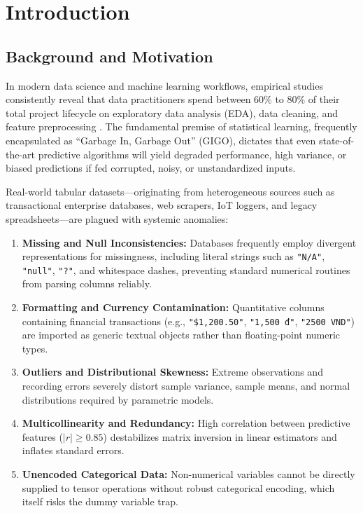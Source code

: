 \section{Introduction}

\subsection{Background and Motivation}
In modern data science and machine learning workflows, empirical studies consistently reveal that data practitioners spend between 60\% to 80\% of their total project lifecycle on exploratory data analysis (EDA), data cleaning, and feature preprocessing \cite{mckinney2010}. The fundamental premise of statistical learning, frequently encapsulated as ``Garbage In, Garbage Out'' (GIGO), dictates that even state-of-the-art predictive algorithms will yield degraded performance, high variance, or biased predictions if fed corrupted, noisy, or unstandardized inputs.

Real-world tabular datasets—originating from heterogeneous sources such as transactional enterprise databases, web scrapers, IoT loggers, and legacy spreadsheets—are plagued with systemic anomalies:
\begin{enumerate}[label=\arabic*.]
  \item \textbf{Missing and Null Inconsistencies:} Databases frequently employ divergent representations for missingness, including literal strings such as \texttt{"N/A"}, \texttt{"null"}, \texttt{"?"}, and whitespace dashes, preventing standard numerical routines from parsing columns reliably.
  \item \textbf{Formatting and Currency Contamination:} Quantitative columns containing financial transactions (e.g., \texttt{"\$1,200.50"}, \texttt{"1,500 đ"}, \texttt{"2500 VND"}) are imported as generic textual objects rather than floating-point numeric types.
  \item \textbf{Outliers and Distributional Skewness:} Extreme observations and recording errors severely distort sample variance, sample means, and normal distributions required by parametric models.
  \item \textbf{Multicollinearity and Redundancy:} High correlation between predictive features ($|r| \ge 0.85$) destabilizes matrix inversion in linear estimators and inflates standard errors.
  \item \textbf{Unencoded Categorical Data:} Non-numerical variables cannot be directly supplied to tensor operations without robust categorical encoding, which itself risks the dummy variable trap.
\end{enumerate}


